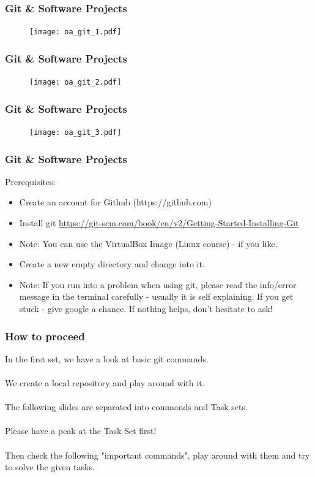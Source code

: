\documentclass{beamer} %
\begin{document}
\begin{frame}[t]
\frametitle{Git \& Software Projects}

\begin{figure}
    \begin{center}
    	\texttt{[image: oa\_git\_1.pdf]}
    \end{center}
\end{figure}
\end{frame}

\begin{frame}[t]
\frametitle{Git \& Software Projects}
\begin{figure}
    \begin{center}
    	\texttt{[image: oa\_git\_2.pdf]}
    \end{center}
\end{figure}
\end{frame}

\begin{frame}[t]
\frametitle{Git \& Software Projects}

\begin{figure}
    \begin{center}
    	\texttt{[image: oa\_git\_3.pdf]}
    \end{center}
\end{figure}
\end{frame}

\begin{frame}[t]
\frametitle{Git \& Software Projects}
Prerequisites:
\begin{itemize}
\item Create an account for Github (https://github.com)
\item Install git \url{https://git-scm.com/book/en/v2/Getting-Started-Installing-Git}
\item Note: You can use the VirtualBox Image (Linux course) - if you like. 
\item Create a new empty directory and change into it.
\item Note: If you run into a problem when using git, please read the info/error message in the terminal carefully - usually it is self explaining. If you get stuck - give google a chance. If nothing helps, don't hesitate to ask! 
\end{itemize}
\end{frame}

\begin{frame}[t, fragile]
\frametitle{How to proceed}
In the first set, we have a look at basic git commands. \\
\\
We create a local repository and play around with it. \\
\\
The following slides are separated into commands and Task sets. \\
\\
Please have a peak at the Task Set first! \\
\\
Then check the following "important commands", play around with them and
try to solve the given tasks. 
\end{frame}
\end{document}
